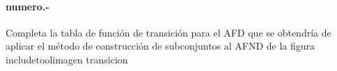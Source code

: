 
\paragraph{{numero}.-}\label{p{numero}}
Completa la tabla de función de transición para el AFD que se obtendría de aplicar el método de construcción de subconjuntos al AFND de la figura
    {includetool}{{imagen}}
{transicion}
